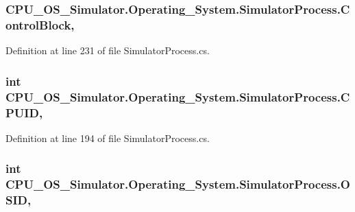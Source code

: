 \subsubsection[{Control\+Block}]{ C\+P\+U\+\_\+\+O\+S\+\_\+\+Simulator.\+Operating\+\_\+\+System.\+Simulator\+Process.\+Control\+Block\hspace{0.3cm}{\ttfamily [get]}, {\ttfamily [set]}}\label{class_c_p_u___o_s___simulator_1_1_operating___system_1_1_simulator_process_a8a79e297abe32002ecbb10e5913155db}


Definition at line 231 of file Simulator\+Process.\+cs.

\hypertarget{class_c_p_u___o_s___simulator_1_1_operating___system_1_1_simulator_process_a456868adfff49f66200bb95a7b64a182}{}
\subsubsection[{C\+P\+U\+I\+D}]{\setlength{\rightskip}{0pt plus 5cm}int C\+P\+U\+\_\+\+O\+S\+\_\+\+Simulator.\+Operating\+\_\+\+System.\+Simulator\+Process.\+C\+P\+U\+I\+D\hspace{0.3cm}{\ttfamily [get]}, {\ttfamily [set]}}\label{class_c_p_u___o_s___simulator_1_1_operating___system_1_1_simulator_process_a456868adfff49f66200bb95a7b64a182}


Definition at line 194 of file Simulator\+Process.\+cs.

\hypertarget{class_c_p_u___o_s___simulator_1_1_operating___system_1_1_simulator_process_aefef06d69f7e70aef73743d2ad3241ee}{}
\subsubsection[{O\+S\+I\+D}]{\setlength{\rightskip}{0pt plus 5cm}int C\+P\+U\+\_\+\+O\+S\+\_\+\+Simulator.\+Operating\+\_\+\+System.\+Simulator\+Process.\+O\+S\+I\+D\hspace{0.3cm}{\ttfamily [get]}, {\ttfamily [set]}}\label{class_c_p_u___o_s___simulator_1_1_operating___system_1_1_simulator_process_aefef06d69f7e70aef73743d2ad3241ee}


